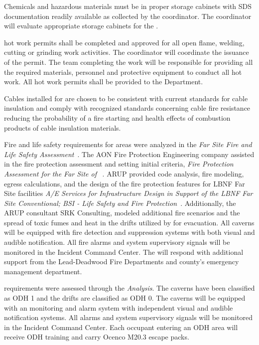 Chemicals and hazardous materials must be in proper storage cabinets
with SDS documentation readily available as collected by the
  coordinator. The
  coordinator will evaluate
appropriate storage cabinets for the .

\fnal hot work permits shall be completed and approved for all open
flame, welding, cutting or grinding work activities.  The 
 coordinator will coordinate the issuance of the permit.
The team completing the work will be responsible for
providing all the required materials, personnel and protective
equipment to conduct all hot work. All hot work permits shall be
provided to the   Department.

Cables installed for  are chosen to be
consistent with current \fnal standards for cable insulation and
comply with recognized standards concerning cable fire resistance
reducing the probability of a fire starting and health effects of
combustion products of cable insulation materials.

Fire and life safety requirements for  areas were
analyzed in the {\it {} Far Site Fire and Life Safety
  Assessment}~. The AON Fire Protection Engineering
company assisted in the fire protection assessment and setting initial
criteria, {\it Fire Protection Assessment for the Far Site of
  }~.  ARUP provided code analysis, fire
modeling, egress calculations, and the design of the fire protection
features for LBNF Far Site facilities {\it A/E Services for
  Infrastructure Design in Support of the LBNF Far Site Conventional;
  BSI - Life Safety and Fire
  Protection}~. Additionally, the ARUP 
consultant SRK Consulting, modeled additional fire scenarios and the
spread of toxic fumes and heat in the drifts utilized by
 for evacuation.  All caverns will be
equipped with fire detection and suppression systems with both visual
and audible notification.  All fire alarms and system supervisory
signals will be monitored in the  Incident Command Center.
The   will respond with additional support from
the Lead-Deadwood Fire Departments and county’s emergency management
department.

 requirements were assessed through the {\it {}
 Analysis}. The caverns have been classified as ODH 1 and
the drifts are classified as ODH 0. The caverns will be equipped with
an  monitoring and alarm system with independent visual and
audible notification systems.  All  alarms and system
supervisory signals will be monitored in the  Incident
Command Center.  Each occupant entering an ODH area will receive ODH
training and carry Ocenco M20.3 escape packs.

